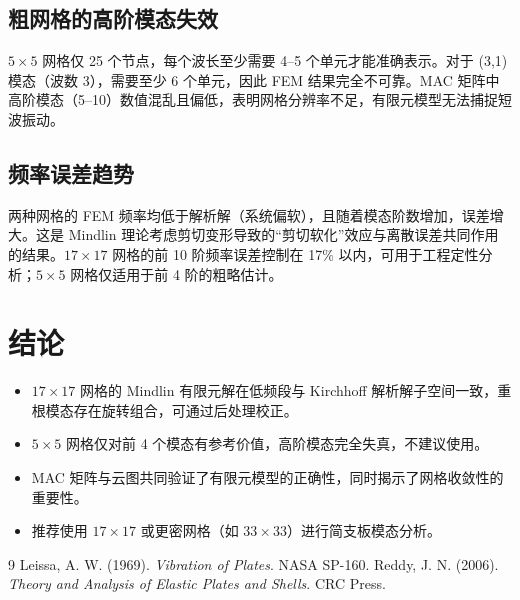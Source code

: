 \documentclass[12pt,a4paper]{article}
\begin{document}
\subsection{粗网格的高阶模态失效}
$5\times5$ 网格仅 25 个节点，每个波长至少需要 4–5 个单元才能准确表示。对于 (3,1) 模态（波数 3），需要至少 6 个单元，因此 FEM 结果完全不可靠。MAC 矩阵中高阶模态（5–10）数值混乱且偏低，表明网格分辨率不足，有限元模型无法捕捉短波振动。

\subsection{频率误差趋势}
两种网格的 FEM 频率均低于解析解（系统偏软），且随着模态阶数增加，误差增大。这是 Mindlin 理论考虑剪切变形导致的“剪切软化”效应与离散误差共同作用的结果。$17\times17$ 网格的前 10 阶频率误差控制在 17\% 以内，可用于工程定性分析；$5\times5$ 网格仅适用于前 4 阶的粗略估计。

\section{结论}
\begin{itemize}
    \item $17\times17$ 网格的 Mindlin 有限元解在低频段与 Kirchhoff 解析解子空间一致，重根模态存在旋转组合，可通过后处理校正。
    \item $5\times5$ 网格仅对前 4 个模态有参考价值，高阶模态完全失真，不建议使用。
    \item MAC 矩阵与云图共同验证了有限元模型的正确性，同时揭示了网格收敛性的重要性。
    \item 推荐使用 $17\times17$ 或更密网格（如 $33\times33$）进行简支板模态分析。
\end{itemize}

\begin{thebibliography}{9}
 Leissa, A. W. (1969). \emph{Vibration of Plates}. NASA SP-160.
 Reddy, J. N. (2006). \emph{Theory and Analysis of Elastic Plates and Shells}. CRC Press.
\end{thebibliography}
\end{document}

